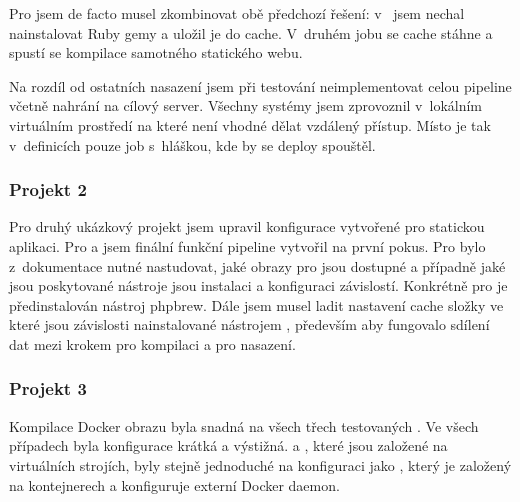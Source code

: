             Pro \semaphore jsem de facto musel zkombinovat obě předchozí řešení: v~ jsem nechal nainstalovat Ruby gemy a uložil je do cache. V~druhém jobu se cache stáhne a spustí se kompilace samotného statického webu.

            Na rozdíl od ostatních nasazení jsem při testování  neimplementovat celou \CI pipeline včetně nahrání na cílový server. Všechny systémy jsem zprovoznil v~lokálním virtuálním prostředí na které není vhodné dělat vzdálený přístup. Místo  je tak v~definicích pouze job s~hláškou, kde by se deploy spouštěl.

        \subsubsection{Projekt 2}
            Pro druhý ukázkový projekt jsem upravil konfigurace vytvořené pro statickou aplikaci. Pro \circleci a \travis jsem finální funkční pipeline vytvořil na první pokus. Pro \semaphore bylo z~dokumentace nutné nastudovat, jaké obrazy pro  jsou dostupné a případně jaké jsou poskytované nástroje jsou instalaci a konfiguraci závislostí. Konkrétně pro  je předinstalován nástroj phpbrew. Dále jsem musel ladit nastavení cache složky  ve které jsou závislosti nainstalované nástrojem , především aby fungovalo sdílení dat mezi krokem pro kompilaci a pro nasazení.

        \subsubsection{Projekt 3}
            Kompilace Docker obrazu byla snadná na všech třech testovaných  \CI. Ve všech případech byla konfigurace krátká a výstižná. \travis a \semaphore, které jsou založené na virtuálních strojích, byly stejně jednoduché na konfiguraci jako \circleci, který je založený na kontejnerech a konfiguruje externí Docker daemon.
